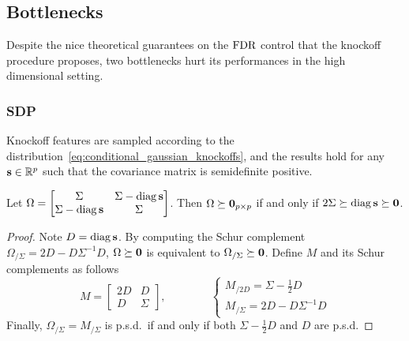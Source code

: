 \subsection{Bottlenecks}\label{subsec:kb}

Despite the nice theoretical guarantees on the $\text{FDR}$ control that the knockoff procedure proposes,
two bottlenecks hurt its performances in the high dimensional setting.

\subsubsection{SDP}\label{subsubsec:bot_sdp}

Knockoff features are sampled according to the distribution~\ref{eq:conditional_gaussian_knockoffs},
and the results hold for any $\mathbf{s} \in \mathbb{R}^p$ such that the covariance matrix is semidefinite positive.

\begin{proposition}
        Let $\Omega = \begin{bmatrix}
                             \Sigma & \Sigma - \operatorname*{diag} \mathbf{s}\\
                             \Sigma - \operatorname*{diag} \mathbf{s} & \Sigma
        \end{bmatrix}$.
        Then $\Omega \succeq \mathbf{0}_{p \times p}$ if and only if $2\Sigma \succeq \operatorname*{diag} \mathbf{s} \succeq \mathbf{0}$.
\end{proposition}

\begin{proof}
        Note $D = \operatorname*{diag}\mathbf{s}$.
        By computing the Schur complement~\cite{schur_complement}
        $\Omega_{/\Sigma} = 2D - D\Sigma^{-1}D$,
        $\Omega \succeq \mathbf{0}$ is equivalent to $\Omega_{/\Sigma} \succeq \mathbf{0}$.
        Define $M$ and its Schur complements as follows
        \begin{equation*}
                M = \begin{bmatrix}
                        2D & D\\
                        D & \Sigma
                \end{bmatrix}
                ,\qquad\qquad
                \begin{cases*}
                        M_{/2D} = \Sigma - \frac{1}{2}D\\
                        M_{/\Sigma} = 2D - D\Sigma^{-1}D
                \end{cases*}
        \end{equation*}
        Finally, $\Omega_{/\Sigma} = M_{/\Sigma}$ is p.s.d.\ if and only if both $\Sigma - \frac{1}{2}D$ and $D$ are p.s.d.
\end{proof}

